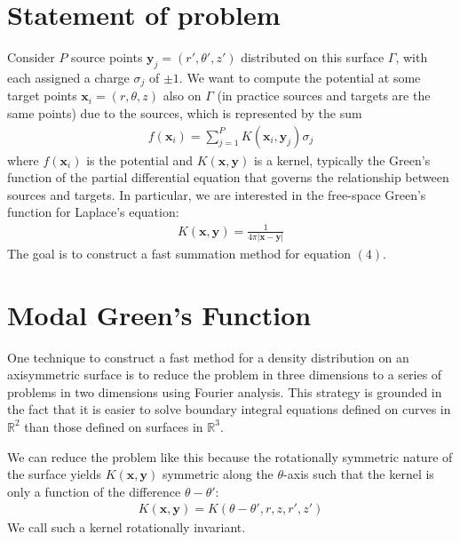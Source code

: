 \documentclass[11pt, oneside]{article}   	%
\begin{document}
\section{Statement of problem}
Consider $P$ source points $\mathbf{y}_j=(r',\theta',z')$ distributed on this surface $\Gamma$, with each assigned a charge $\sigma_j$ of $\pm 1$. We want to compute the potential at some target points $\mathbf{x}_i=(r,\theta,z)$ also on $\Gamma$ (in practice sources and targets are the same points) due to the sources, which is represented by the sum
\begin{align}
f(\mathbf{x}_i) = \sum_{j=1}^P K(\mathbf{x}_i,\mathbf{y}_j)\sigma_j
\end{align}
where $f(\mathbf{x}_i)$ is the potential and $K(\mathbf{x},\mathbf{y})$ is a kernel, typically the Green's function of the partial differential equation that governs the relationship between sources and targets. In particular, we are interested in the free-space Green's function for Laplace's equation:
\begin{align}
K(\mathbf{x},\mathbf{y}) = \frac{1}{4\pi |\mathbf{x}-\mathbf{y}|}
\end{align}
The goal is to construct a fast summation method for equation $(4)$.

\section{Modal Green's Function}

One technique to construct a fast method for a density distribution on an axisymmetric surface is to reduce the problem in three dimensions to a series of problems in two dimensions using Fourier analysis. This strategy is grounded in the fact that it is easier to solve boundary integral equations defined on curves in $\mathbb{R}^2$ than those defined on surfaces in $\mathbb{R}^3$.

We can reduce the problem like this because the rotationally symmetric nature of the surface yields $K(\mathbf{x},\mathbf{y})$ symmetric along the $\theta$-axis such that the kernel is only a function of the difference $\theta-\theta'$:
\begin{align}
K(\mathbf{x},\mathbf{y})=K(\theta-\theta',r,z,r',z')
\end{align}
We call such a kernel rotationally invariant.
\end{document}
